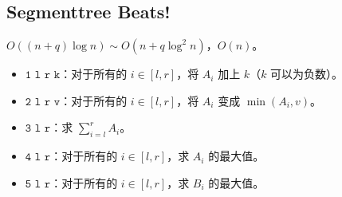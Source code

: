 \documentclass{ctexart}
\begin{document}
\subsection{Segmenttree Beats!}

$O((n+q)\log n)\sim O(n+q\log^2 n)$，$O(n)$。

\begin{itemize}

\item $\texttt{1 l r k}$：对于所有的 $i\in[l,r]$，将 $A_i$ 加上 $k$（$k$ 可以为负数）。
\item $\texttt{2 l r v}$：对于所有的 $i\in[l,r]$，将 $A_i$ 变成 $\min(A_i,v)$。
\item $\texttt{3 l r}$：求 $\sum_{i=l}^{r}A_i$。
\item $\texttt{4 l r}$：对于所有的 $i\in[l,r]$，求 $A_i$ 的最大值。
\item $\texttt{5 l r}$：对于所有的 $i\in[l,r]$，求 $B_i$ 的最大值。
\end{itemize}
\end{document}
